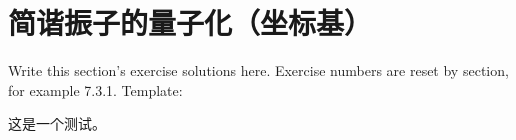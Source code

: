 ﻿%
\section{简谐振子的量子化（坐标基）}

Write this section's exercise solutions here.
Exercise numbers are reset by section, for example 7.3.1.
Template:
\begin{solution}
\answer
这是一个测试。
\end{solution}

